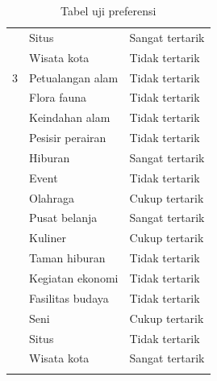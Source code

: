 \begin{center}
\begin{longtable}{ |l|l|l| }
					&	Situs				& Sangat tertarik \\
					&	Wisata kota			& Tidak tertarik \\
\hline
				3	&	Petualangan alam	& Tidak tertarik \\
					&	Flora fauna			& Tidak tertarik \\
					&	Keindahan alam		& Tidak tertarik \\
					&	Pesisir perairan	& Tidak tertarik \\
					&	Hiburan				& Sangat tertarik \\
					&	Event				& Tidak tertarik \\
					&	Olahraga			& Cukup tertarik \\
					&	Pusat belanja		& Sangat tertarik \\
					&	Kuliner				& Cukup tertarik \\
					&	Taman hiburan		& Tidak tertarik \\
					&	Kegiatan ekonomi	& Tidak tertarik \\
					&	Fasilitas budaya	& Tidak tertarik \\
					&	Seni				& Cukup tertarik \\
					&	Situs				& Tidak tertarik \\
					&	Wisata kota			& Sangat tertarik \\
\hline
\caption{Tabel uji preferensi}
\label{table:scenario-pref}
\end{longtable}
\end{center}

